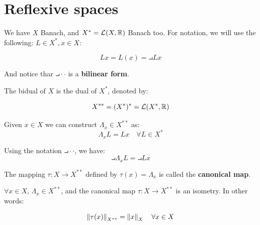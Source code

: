 \section{Reflexive spaces}

\begin{note}
    We have $X$ Banach, and $X^* = \mathcal{L}(X, \mathbb{R})$ Banach too. For notation, 
    we will use the following: $L \in X^{*}, x \in X$:

    $$L x = L(x) = \intprod{L}{x}$$

    And notice thar $\intprod{\cdot}{\cdot}$ is a \textbf{bilinear form}.
\end{note}

\begin{fdefinition}
    The bidual of $X$ is the dual of $X^*$, denoted by:

    $$X^{**} = (X^*)^* = \mathcal{L}(X^*, \mathbb{R})$$
\end{fdefinition}

\begin{fdefinition}
    Given $x \in X$ we can construct $\Lambda_x \in X^{**}$ as:
    $$\Lambda_x L = Lx \quad \forall L \in X^*$$

    Using the notation $\intprod{\cdot}{\cdot}$, we have:
    $$\intprod{\Lambda_x}{L} = \intprod{L}{x}$$

    The mapping $\tau: X \to X^{**}$ defined by $\tau(x) = \Lambda_x$ is called the
    \textbf{canonical map}.\\
\end{fdefinition}

\vspace{1em}

\begin{fproposition}
    $\forall x \in X$, $\Lambda_x \in X^{**}$, and
   the canonical map $\tau: X \to X^{**}$ is an isometry. In other words:

    $$\left\|\tau(x)\right\|_{X^{**}} = \left\|x\right\|_X \quad \forall x \in X$$

\end{fproposition}

